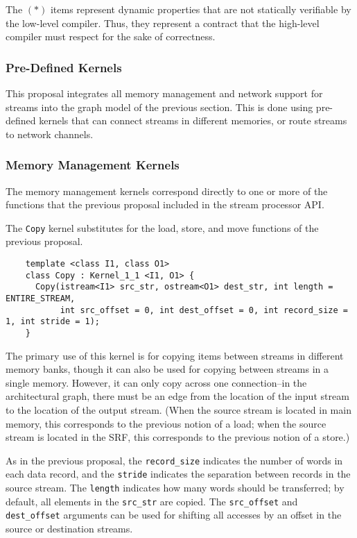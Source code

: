 The $(*)$ items represent dynamic properties that are not statically
verifiable by the low-level compiler.  Thus, they represent a contract
that the high-level compiler must respect for the sake of correctness.

\subsubsection{Pre-Defined Kernels}
\label{sec:predef}

This proposal integrates all memory management and network support for
streams into the graph model of the previous section.  This is done
using pre-defined kernels that can connect streams in different
memories, or route streams to network channels.

\subsubsection*{Memory Management Kernels}

The memory management kernels correspond directly to one or more of
the functions that the previous proposal included in the stream
processor API.

 The {\tt Copy} kernel substitutes for the load, store, and move
functions of the previous proposal.
{\small
\begin{verbatim}
    template <class I1, class O1>
    class Copy : Kernel_1_1 <I1, O1> {
      Copy(istream<I1> src_str, ostream<O1> dest_str, int length = ENTIRE_STREAM,
           int src_offset = 0, int dest_offset = 0, int record_size = 1, int stride = 1);
    }
\end{verbatim}}

The primary use of this kernel is for copying items between streams in
different memory banks, though it can also be used for copying between
streams in a single memory.  However, it can only copy across one
connection--in the architectural graph, there must be an edge from the
location of the input stream to the location of the output stream.
(When the source stream is located in main memory, this corresponds to
the previous notion of a load; when the source stream is located in
the SRF, this corresponds to the previous notion of a store.)

As in the previous proposal, the {\tt record\_size} indicates the
number of words in each data record, and the {\tt stride} indicates
the separation between records in the source stream.  The {\tt length}
indicates how many words should be transferred; by default, all
elements in the {\tt src\_str} are copied.  The {\tt src\_offset} and
{\tt dest\_offset} arguments can be used for shifting all accesses by
an offset in the source or destination streams.  

